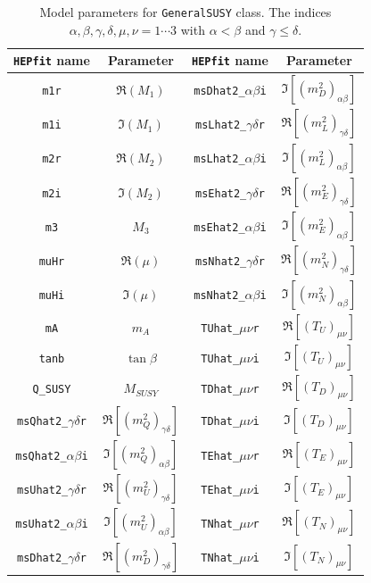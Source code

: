 \documentclass[preprint,3p,12pt]{elsarticle}
\newcommand{\HEPfit}{\texttt{HEPfit}\xspace}
\begin{document}
\begin{appendices}
\begin{table}[t]
\begin{center}
\begin{tabular}{|c|c||c|c|}
\hline
\HEPfit name & Parameter & \HEPfit name & Parameter \\
\hline
\texttt{m1r} & $\Re(M_{1})$ & \texttt{msDhat2\_$\alpha\beta$i} & $\Im[(m_{D}^{2})_{\alpha\beta}]$ \\
\texttt{m1i} & $\Im(M_{1})$ & \texttt{msLhat2\_$\gamma\delta$r} & $\Re[(m_{L}^{2})_{\gamma\delta}]$ \\
\texttt{m2r} & $\Re(M_{2})$ & \texttt{msLhat2\_$\alpha\beta$i} & $\Im[(m_{L}^{2})_{\alpha\beta}]$ \\
\texttt{m2i} & $\Im(M_{2})$ & \texttt{msEhat2\_$\gamma\delta$r} & $\Re[(m_{E}^{2})_{\gamma\delta}]$  \\
\texttt{m3} &  $M_{3}$ & \texttt{msEhat2\_$\alpha\beta$i} & $\Im[(m_{E}^{2})_{\alpha\beta}]$ \\
\texttt{muHr} & $\Re(\mu)$ & \texttt{msNhat2\_$\gamma\delta$r} & $\Re[(m_{N}^{2})_{\gamma\delta}]$ \\
\texttt{muHi} & $\Im(\mu)$ & \texttt{msNhat2\_$\alpha\beta$i} & $\Im[(m_{N}^{2})_{\alpha\beta}]$  \\
\texttt{mA} & $m_{A}$ & \texttt{TUhat\_$\mu\nu$r} & $\Re[(T_{U})_{\mu\nu}]$ \\
\texttt{tanb} & $\tan\beta$ & \texttt{TUhat\_$\mu\nu$i} & $\Im[(T_{U})_{\mu\nu}]$ \\
\texttt{Q\_SUSY} & $M_{SUSY}$ & \texttt{TDhat\_$\mu\nu$r} & $\Re[(T_{D})_{\mu\nu}]$ \\
\texttt{msQhat2\_$\gamma\delta$r} & $\Re[(m_{Q}^{2})_{\gamma\delta}]$ & \texttt{TDhat\_$\mu\nu$i} & $\Im[(T_{D})_{\mu\nu}]$ \\
\texttt{msQhat2\_$\alpha\beta$i} & $\Im[(m_{Q}^{2})_{\alpha\beta}]$ & \texttt{TEhat\_$\mu\nu$r} & $\Re[(T_{E})_{\mu\nu}]$ \\
\texttt{msUhat2\_$\gamma\delta$r} & $\Re[(m_{U}^{2})_{\gamma\delta}]$ & \texttt{TEhat\_$\mu\nu$i} & $\Im[(T_{E})_{\mu\nu}]$\\
\texttt{msUhat2\_$\alpha\beta$i} & $\Im[(m_{U}^{2})_{\alpha\beta}]$ & \texttt{TNhat\_$\mu\nu$r} & $\Re[(T_{N})_{\mu\nu}]$ \\
\texttt{msDhat2\_$\gamma\delta$r} & $\Re[(m_{D}^{2})_{\gamma\delta}]$ & \texttt{TNhat\_$\mu\nu$i} & $\Im[(T_{N})_{\mu\nu}]$ \\ 
\hline
\end{tabular}
\end{center}
\caption{Model parameters for \texttt{GeneralSUSY} class. The indices $\alpha, \beta, \gamma, \delta, \mu, \nu = 1 \cdots 3$ with $\alpha<\beta$ and $\gamma \leq \delta$.}
\label{default}
\end{table}%


\end{appendices}
\end{document}
